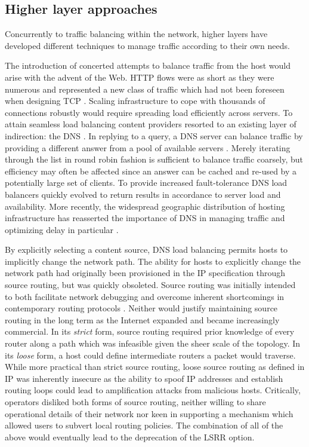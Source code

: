 \subsection{Higher layer approaches}

Concurrently to traffic balancing within the network, higher layers have developed different techniques to manage traffic according to their own needs.

The introduction of concerted attempts to balance traffic from the host would arise with the advent of the Web.
\ac{HTTP} flows were as short as they were numerous and represented a new class of traffic which had not been foreseen when designing \ac{TCP} \cite{Day:2010p187}.
Scaling infrastructure to cope with thousands of connections robustly would require spreading load efficiently across servers.
To attain seamless load balancing content providers resorted to an existing layer of indirection: the \ac{DNS} \cite{Mockapetris:1987p527}.
In replying to a query, a \ac{DNS} server can balance traffic by providing a different answer from a pool of available servers \cite{Brisco:1995p448}.
Merely iterating through the list in round robin fashion is sufficient to balance traffic coarsely, but efficiency may often be affected since an answer can be cached and re-used by a potentially large set of clients.
To provide increased fault-tolerance \ac{DNS} load balancers quickly evolved to return results in accordance to server load and availability.
More recently, the widespread geographic distribution of hosting infrastructure has reasserted the importance of \ac{DNS} in managing traffic and optimizing delay in particular \cite{Ager:2011p528}.

By explicitly selecting a content source, \ac{DNS} load balancing permits hosts to implicitly change the network path.
The ability for hosts to explicitly change the network path had originally been provisioned in the \ac{IP} specification through source routing, but was quickly obsoleted.
Source routing was initially intended to both facilitate network debugging and overcome inherent shortcomings in contemporary routing protocols \cite{Sunshine:1977p152}.
Neither would justify maintaining source routing in the long term as the Internet expanded and became increasingly commercial.
In its \emph{strict} form, source routing required prior knowledge of every router along a path which was infeasible given the sheer scale of the topology.
In its \emph{loose} form, a host could define intermediate routers a packet would traverse. 
While more practical than strict source routing, loose source routing as defined in \ac{IP} was inherently insecure as the ability to spoof \ac{IP} addresses and establish routing loops could lead to amplification attacks from malicious hosts.
Critically, operators disliked both forms of source routing, neither willing to share operational details of their network nor keen in supporting a mechanism which allowed users to subvert local routing policies.
The combination of all of the above would eventually lead to the deprecation of the \ac{LSRR} option.

